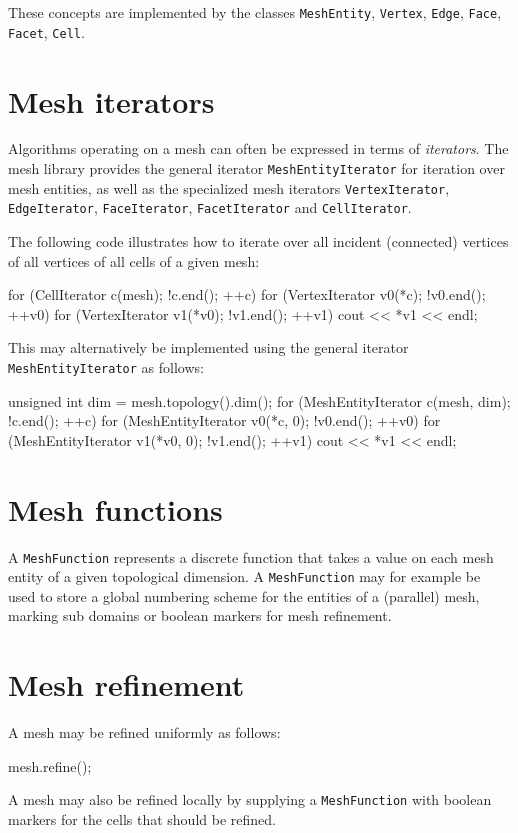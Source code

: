 These concepts are implemented by the classes
\texttt{MeshEntity},
\texttt{Vertex},
\texttt{Edge},
\texttt{Face},
\texttt{Facet},
\texttt{Cell}.

\section{Mesh iterators}

Algorithms operating on a mesh
can often be expressed in terms of
\emph{iterators}. The mesh library provides the general iterator
\texttt{MeshEntityIterator} for iteration over mesh entities, as well
as the specialized mesh iterators
\texttt{VertexIterator},
\texttt{EdgeIterator},
\texttt{FaceIterator},
\texttt{FacetIterator} and
\texttt{Cell\-Iterator}.

The following code illustrates how to iterate over all incident
(connected) vertices of all vertices of all cells of a given mesh:
\begin{code}
for (CellIterator c(mesh); !c.end(); ++c)
  for (VertexIterator v0(*c); !v0.end(); ++v0)
    for (VertexIterator v1(*v0); !v1.end(); ++v1)
      cout << *v1 << endl;
\end{code}
This may alternatively be implemented using the general iterator
\texttt{MeshEntity\-Iterator} as follows:
\begin{code}
unsigned int dim = mesh.topology().dim();
for (MeshEntityIterator c(mesh, dim); !c.end(); ++c)
  for (MeshEntityIterator v0(*c, 0); !v0.end(); ++v0)
    for (MeshEntityIterator v1(*v0, 0); !v1.end(); ++v1)
      cout << *v1 << endl;
\end{code}

\section{Mesh functions}

A \texttt{MeshFunction} represents a discrete function that takes a
value on each mesh entity of a given topological dimension.
A \texttt{MeshFunction} may for example be used to store a global
numbering scheme for the entities of a (parallel) mesh, marking
sub domains or boolean markers for mesh refinement.

\section{Mesh refinement}

A mesh may be refined uniformly as follows:
\begin{code}
mesh.refine();
\end{code}
A mesh may also be refined locally by supplying a
\texttt{MeshFunction} with boolean markers for the cells that should
be refined.

